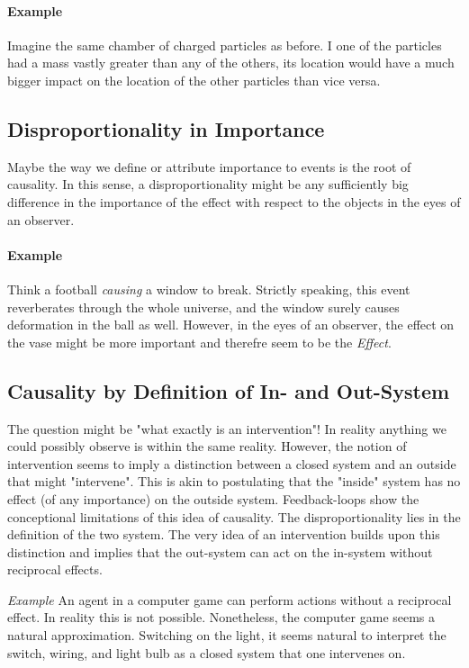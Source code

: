 \documentclass{article}
\begin{document}
\paragraph{Example} Imagine the same chamber of charged particles as before. I one of the particles had a mass vastly greater than any of the others, its location would have a much bigger impact on the location of the other particles than vice versa.

\subsection{Disproportionality in Importance}
Maybe the way we define or attribute importance to events is the root of causality. In this sense, a disproportionality might be any sufficiently big difference in the importance of the effect with respect to the objects in the eyes of an observer.

\paragraph{Example}
Think a football \emph{causing} a window to break. Strictly speaking, this event reverberates through the whole universe, and the  window surely causes deformation in the ball as well. However, in the eyes of an observer, the effect on the vase might be more important and therefre seem to be the \emph{Effect}.

\subsection{Causality by Definition of In- and Out-System}

The question might be "what exactly is an intervention"!
In reality anything we could possibly observe is within the same reality. However, the notion of intervention seems to imply a distinction between a closed system and an outside that might "intervene". This is akin to postulating that the "inside" system has no effect (of any importance) on the outside system. Feedback-loops show the conceptional limitations of this idea of causality.
The disproportionality lies in the definition of the two system. The very idea of an intervention builds upon this distinction and implies that the out-system can act on the in-system without reciprocal effects. 

\emph{Example} An agent in a computer game can perform actions without a reciprocal effect. In reality this is not possible. Nonetheless, the computer game seems a natural approximation. Switching on the light, it seems natural to interpret the switch, wiring, and light bulb as a closed system that one intervenes on.
\end{document}
